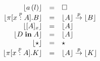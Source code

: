 \begin{figure}

\begin{center}
\begin{math}
\begin{array}{rclr}
\lfloor a\,(l) \rfloor
&=&
\square
\\

\lfloor \pi [x \stackrel{p}{:} A]. B \rfloor
&=&
\lfloor A \rfloor \stackrel{p}{\rightarrow} \lfloor B \rfloor
\\

\lfloor [ A ]_{x} \rfloor
&=&
\lfloor A \rfloor
\\

\lfloor D \;\textbf{in}\; A \rfloor
&=&
\lfloor A \rfloor
\\

\lfloor \star \rfloor
&=&
\star
\\

\lfloor \pi [x \stackrel{p}{:} A]. K \rfloor
&=&
\lfloor A \rfloor \stackrel{p}{\rightarrow} \lfloor K \rfloor
\\

\end{array}
\end{math}
\end{center}
\end{figure}
